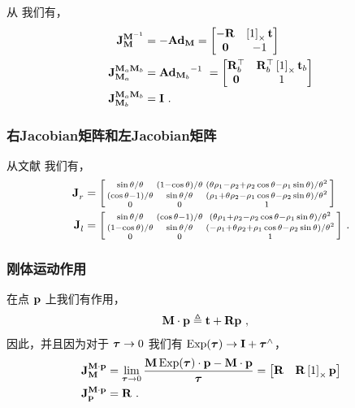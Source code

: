 从  我们有，
%
\begin{align}
\mjac{\bfM\inv}{\bfM} &= -\Ad[\SE(2)]{\bfM} = \begin{bmatrix} -\bfR & \hatx{1}\bft \\ \bf0 & -1 \end{bmatrix}  \\
\mjac{\bfM_a\bfM_b}{\bfM_a} &= \Ad[\SE(2)]{\bfM_b}\inv ~= \begin{bmatrix} \bfR_b\tr & \bfR_b\tr\hatx{1}\bft_b \\ \bf0 & 1 \end{bmatrix} \\
\mjac{\bfM_a\bfM_b}{\bfM_b} &= \bfI 
~.
\end{align}

\subsubsection{右Jacobian矩阵和左Jacobian矩阵}

从文献 \cite[pag.~36]{CHIRIKJIAN-11} 我们有，
%
\begin{align}
\mjac{}{r} &= \begin{bsmallmatrix}
\sin\theta/\theta & (1-\cos\theta)/\theta & (\theta \rho_1 - \rho_2 + \rho_2 \cos\theta - \rho_1 \sin\theta)/\theta^2 \\
(\cos\theta-1)/\theta & \sin\theta/\theta & (\rho_1 + \theta \rho_2 - \rho_1 \cos\theta - \rho_2 \sin\theta)/\theta^2 \\
0 & 0 & 1
\end{bsmallmatrix} \\
\mjac{}{l} &= \begin{bsmallmatrix}
\sin\theta/\theta & (\cos\theta-1)/\theta & (\theta \rho_1 + \rho_2 - \rho_2 \cos\theta - \rho_1 \sin\theta)/\theta^2 \\
(1-\cos\theta)/\theta & \sin\theta/\theta & (-\rho_1 + \theta \rho_2 + \rho_1 \cos\theta - \rho_2 \sin\theta)/\theta^2 \\
0 & 0 & 1
\end{bsmallmatrix} 
~.
\end{align}

\subsubsection{刚体运动作用}

在点 $\bfp$ 上我们有作用，
%
\begin{align}
\bfM\cdot\bfp &\te \bft+\bfR\bfp
~,
\end{align}
%
因此，并且因为对于 ${\bftau}\to0$ 我们有 $\Exp(\bftau)\to\bfI+\bftau\hhat$，
%
\begin{align}
\mjac{\bfM\cdot\bfp}{\bfM} 
  &= 
  \lim_{\bftau\to0}\frac{\bfM\Exp(\bftau)\cdot\bfp - \bfM\cdot\bfp}{\bftau}
  = 
  \begin{bmatrix}\bfR & \bfR\hatx{1}\bfp\end{bmatrix} \\
\mjac{\bfM\cdot\bfp}{\bfp} &= \bfR 
~.
\end{align}
%

